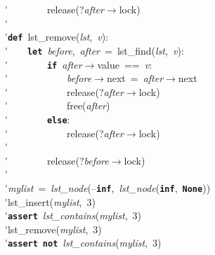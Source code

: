 \'\>~~~~~~~~release(?\textit{after}$\rightarrow$lock)\\

\'\>\\

\'\>\texttt{\textbf{def}}~lst\_remove(\textit{lst},~\textit{v}):\\

\'\>~~~~\texttt{\textbf{let}}~\textit{before},~\textit{after}~=~lst\_find(\textit{lst},~\textit{v}):\\

\'\>~~~~~~~~\texttt{\textbf{if}}~\textit{after}$\rightarrow$value~==~\textit{v}:\\

\'\>~~~~~~~~~~~~\textit{before}$\rightarrow$next~=~\textit{after}$\rightarrow$next\\

\'\>~~~~~~~~~~~~release(?\textit{after}$\rightarrow$lock)\\

\'\>~~~~~~~~~~~~free(\textit{after})\\

\'\>~~~~~~~~\texttt{\textbf{else}}:\\

\'\>~~~~~~~~~~~~release(?\textit{after}$\rightarrow$lock)\\

\'\>~~~~~~~~\\

\'\>~~~~~~~~release(?\textit{before}$\rightarrow$lock)\\

\'\>\\

\'\>\textit{mylist}~=~\textit{lst\_node}(--\texttt{\textbf{inf}},~\textit{lst\_node}(\texttt{\textbf{inf}},~\texttt{\textbf{None}}))\\

\'\>lst\_insert(\textit{mylist},~3)\\

\'\>\texttt{\textbf{assert}}~\textit{lst\_contains}(\textit{mylist},~3)\\

\'\>lst\_remove(\textit{mylist},~3)\\

\'\>\texttt{\textbf{assert}}~\texttt{\textbf{not}}~\textit{lst\_contains}(\textit{mylist},~3)